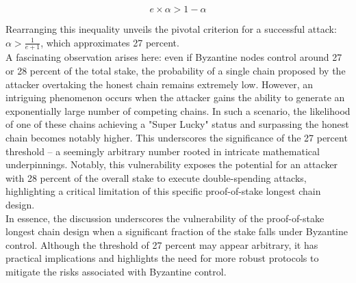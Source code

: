 $$
e \times \alpha > 1 - \alpha
$$

Rearranging this inequality unveils the pivotal criterion for a successful attack: \(\alpha > \frac{1}{e + 1}\), which approximates 27 percent.\\
A fascinating observation arises here: even if Byzantine nodes control around 27 or 28 percent of the total stake, the probability of a single chain proposed by the attacker overtaking the honest chain remains extremely low. However, an intriguing phenomenon occurs when the attacker gains the ability to generate an exponentially large number of competing chains. In such a scenario, the likelihood of one of these chains achieving a "Super Lucky" status and surpassing the honest chain becomes notably higher. This underscores the significance of the 27 percent threshold – a seemingly arbitrary number rooted in intricate mathematical underpinnings. Notably, this vulnerability exposes the potential for an attacker with 28 percent of the overall stake to execute double-spending attacks, highlighting a critical limitation of this specific proof-of-stake longest chain design.\\
In essence, the discussion underscores the vulnerability of the proof-of-stake longest chain design when a significant fraction of the stake falls under Byzantine control. Although the threshold of 27 percent may appear arbitrary, it has practical implications and highlights the need for more robust protocols to mitigate the risks associated with Byzantine control.

